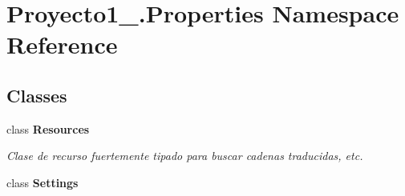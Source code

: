 \hypertarget{namespace_proyecto1__1096917_1_1_properties}{}\section{Proyecto1\+\_.\+Properties Namespace Reference}
\label{namespace_proyecto1__1096917_1_1_properties}
\subsection*{Classes}
\begin{DoxyCompactItemize}
\item 
class {\bfseries Resources}
\begin{DoxyCompactList}\small\item\em Clase de recurso fuertemente tipado para buscar cadenas traducidas, etc. \end{DoxyCompactList}\item 
class {\bfseries Settings}
\end{DoxyCompactItemize}
